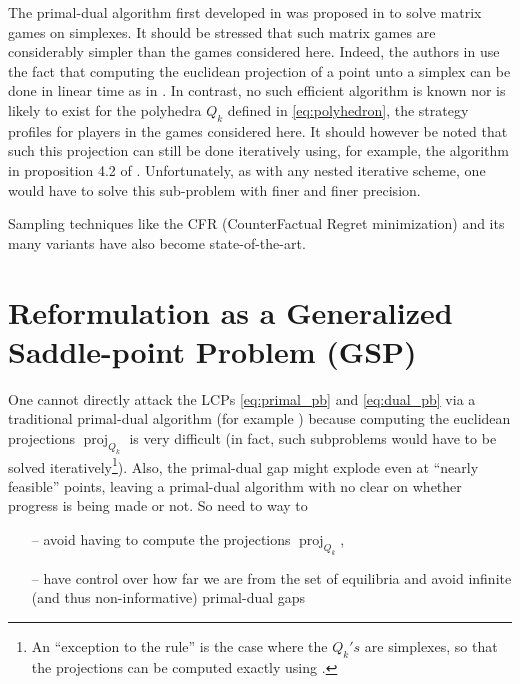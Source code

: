 \documentclass{article} %
\DeclareMathOperator{\proj}{proj}
\begin{document}


The primal-dual algorithm first developed in \cite{chambolle2010} was
proposed \cite{chambolle2014ergodic} in to solve matrix games on
simplexes. It should be stressed that such matrix games are
considerably simpler than the games considered here. Indeed, the
authors in \cite{chambolle2014ergodic} use the fact that computing the
euclidean projection of a point unto a simplex can be done in linear
time as in \cite{duchi2008efficient}. In contrast, no such efficient
algorithm is known nor is likely to exist for the polyhedra $Q_k$
defined in \eqref{eq:polyhedron}, the strategy profiles for players in
the games considered here. It should however be noted that such this
projection can still be done iteratively using, for example, the
algorithm in proposition 4.2 of \cite{combettes2010dualization}%
. Unfortunately, as
with any nested iterative scheme, one would have to solve this
sub-problem with finer and finer precision.


Sampling techniques like the CFR (CounterFactual Regret minimization)
and its many variants
\cite{MartinZinkevichNIPS2007,lanctot2009monte,Bowling09012015} have
also become state-of-the-art.


\section{Reformulation as a Generalized Saddle-point Problem (GSP)}
\label{sec:gsp}
One cannot directly attack the LCPs \eqref{eq:primal_pb} and
\eqref{eq:dual_pb} via a traditional primal-dual algorithm
(for example \cite{chambolle2010,chambolle2014ergodic}) because
computing the euclidean projections $\proj_{Q_k}$ is very difficult
(in fact, such subproblems would have to be solved
iteratively\footnote{An ``exception to the rule'' is the case where
  the $Q_k's$ are simplexes, so that the projections can be computed
  exactly using \cite{duchi2008efficient}.}). Also,
the primal-dual gap might explode even at ``nearly feasible'' points,
leaving a primal-dual algorithm with no clear on whether progress is
being made or not. So need to way to
\begin{itemize}
\item[--] avoid having to compute the projections $\proj_{Q_k}$,
\item[--] have control over how far we are from the set of equilibria and
  avoid infinite (and thus non-informative) primal-dual gaps
\end{itemize}
\end{document}
